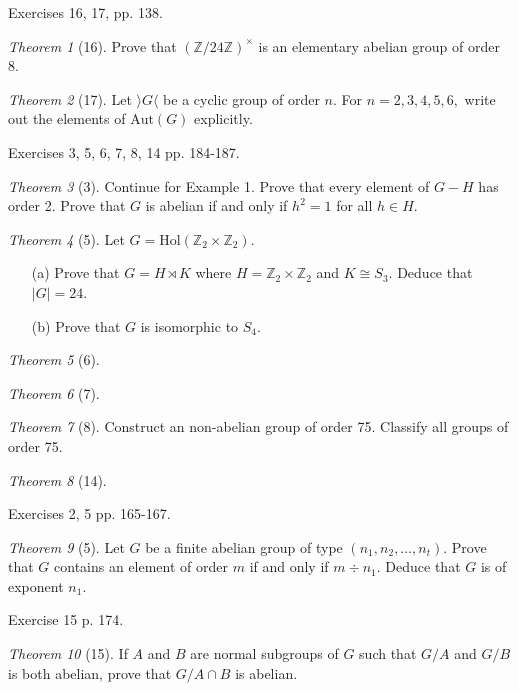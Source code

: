 \documentclass[12pt]{article}
\theoremstyle{remark}
\theoremstyle{named}
\newtheorem*{theorem}{Theorem}
\newcommand{\Aut}{\text{Aut}}
\begin{document}
Exercises 16, 17, pp. 138.

\begin{theorem}[16]
    Prove that \((\mathbb Z / 24 \mathbb Z)^\times\) is an elementary abelian group of order 8.
\end{theorem}

\begin{theorem}[17]
    Let \(\rangle G \langle\) be a cyclic group of order \(n\). For \(n = 2, 3, 4, 5, 6,\) write out the elements of \(\Aut(G)\) explicitly.
\end{theorem}

Exercises 3, 5, 6, 7, 8, 14 pp. 184-187.

\begin{theorem}[3]
    Continue for Example 1. Prove that every element of \(G - H\) has order 2. Prove that \(G\) is abelian if and only if \(h^2 = 1\) for all \(h \in H\). 
\end{theorem}

\begin{theorem}[5]
    Let \(G = \text{Hol}(\mathbb Z_2 \times \mathbb Z_2)\).
    \begin{enumerate}
        \item[(a)] Prove that \(G = H \rtimes K\) where \(H = \mathbb Z_2 \times \mathbb Z_2\) and \(K \cong S_3\). Deduce that \(|G| = 24\).
        \item[(b)] Prove that \(G\) is isomorphic to \(S_4\).  
    \end{enumerate}
\end{theorem}

\begin{theorem}[6]
    
\end{theorem}

\begin{theorem}[7]
    
\end{theorem}

\begin{theorem}[8]
    Construct an non-abelian group of order 75. Classify all groups of order 75. 
\end{theorem}

\begin{theorem}[14]
    
\end{theorem}

Exercises 2, 5 pp. 165-167.



\begin{theorem}[5]
    Let \(G\) be a finite abelian group of type \((n_1, n_2, \dots, n_t)\). Prove that \(G\) contains an element of order \(m\) if and only if \(m \div n_1\). Deduce that \(G\) is of exponent \(n_1\).
\end{theorem}

Exercise 15 p. 174.

\begin{theorem}[15]
    If \(A\) and \(B\) are normal subgroups of \(G\) such that \(G / A\) and \(G / B\) is both abelian, prove that \(G / A \cap B\) is abelian.
\end{theorem}
\end{document}
